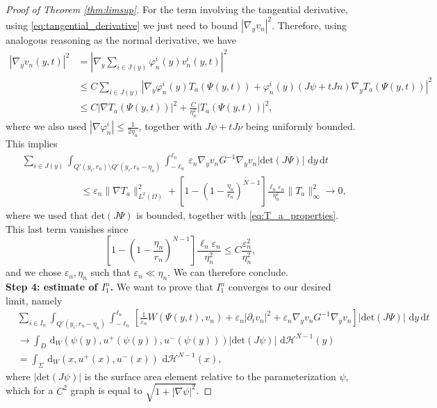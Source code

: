 \documentclass[a4paper, 11pt, reqno]{amsart}
\theoremstyle{plain}
\theoremstyle{definition}
\theoremstyle{remark}
\newcommand{\dd}{\,\mathrm{d}}
\begin{document}
\begin{proof}[Proof of Theorem \ref{thm:limsup}]
For the term involving the tangential derivative, using \eqref{eq:tangential_derivative} we just need to bound $|\nabla_y v_n|^2$. Therefore, using analogous reasoning as the normal derivative, we have
\begin{align*}
    | \nabla_y v_n(y,t)|^2 &= \left| \nabla_y \sum_{i \in J(y)} \varphi_n^i(y) v_n^i (y,t) \right|^2 \\
    &\leq C \sum_{i \in J(y)} | \nabla_y \varphi_n^i(y) T_a (\Psi(y,t)) + \varphi_n^i(y) (J \psi + t Jn) \nabla_y T_a (\Psi(y,t)) |^2\\
    &\leq C | \nabla T_a (\Psi(y,t))|^2 + \frac{C}{\eta_n^2} | T_a (\Psi(y,t)) |^2,
\end{align*}
where we also used $| \nabla \varphi_n^i | \leq \frac{1}{2 \eta_n}$, together with $J\psi + t J \nu$ being uniformly bounded.
This implies
\begin{align}
    &\sum_{i \in J(y)} \int_{Q'(y_i,r_n) \setminus Q'(y_i, r_n - \eta_n)} \int_{-\ell_n}^{\ell_n} \varepsilon_n \nabla_y v_n G^{-1} \nabla_y v_n | \mathrm{det}(J\Psi)|\, \dd y \dd t \nonumber\\
    &\qquad\qquad\qquad\leq \varepsilon_n \| \nabla T_a \|^2_{L^2(\Omega)} + \left[ 1 - \left( 1 - \frac{\eta_n}{r_n} \right)^{N-1} \right] \frac{\ell_n \varepsilon_n}{\eta_n^2} \| T_a \|^2_\infty \to 0,
\end{align}
where we used that $\mathrm{det}(J \Psi)$ is bounded, together with \eqref{eq:T_a_properties}.
This last term vanishes since 
$$ \left[ 1 - \left( 1 - \frac{\eta_n}{r_n} \right)^{N-1} \right] \frac{\ell_n \varepsilon_n}{\eta_n^2} \leq C \frac{\varepsilon_n^2}{\eta_n^2}, $$
and we chose $\varepsilon_n, \eta_n$ such that $\varepsilon_n \ll \eta_n$. We can therefore conclude.\\[0.5em]
\textbf{Step 4: estimate of $I_1^n$.}
We want to prove that $I_1^n$ converges to our desired limit, namely
\begin{align*}
    &\sum_{i \in I_n} \int_{Q'(y_i,r_n-\eta_n)} \int_{-\ell_n}^{\ell_n} \left[ \frac{1}{\varepsilon_n} W(\Psi(y,t), v_n) + \varepsilon_n | \partial_t v_n|^2 + \varepsilon_n \nabla_y v_n G^{-1} \nabla_y v_n \right] | \mathrm{det}(J\Psi)|\, \dd y \dd t \\
    &\to \int_D \dd_W (\psi(y), u^+(\psi(y)),u^-(\psi(y))) | \mathrm{det}(J \psi)|\, \dd \mathcal{H}^{N-1}(y)\\
    &= \int_\Sigma \dd_W (x, u^+ (x), u^- (x)) \, \dd \mathcal{H}^{N-1}(x),
\end{align*}
where $|\mathrm{det}(J\psi)|$ is the surface area element relative to the parameterization $\psi$, which for a $C^2$ graph is equal to $\sqrt{1 + |\nabla \psi |^2}$.


\end{proof}
\end{document}
